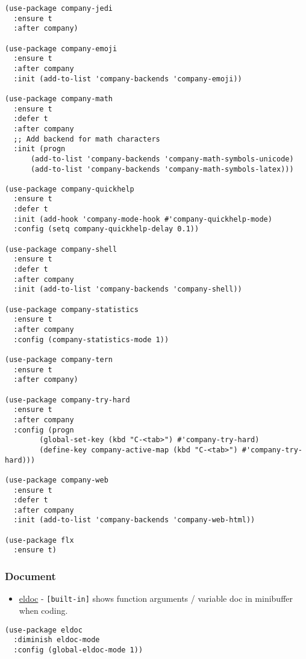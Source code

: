 \documentclass[11pt]{article}
\begin{document}
\begin{verbatim}
(use-package company-jedi
  :ensure t
  :after company)

(use-package company-emoji
  :ensure t
  :after company
  :init (add-to-list 'company-backends 'company-emoji))

(use-package company-math
  :ensure t
  :defer t
  :after company
  ;; Add backend for math characters
  :init (progn
	  (add-to-list 'company-backends 'company-math-symbols-unicode)
	  (add-to-list 'company-backends 'company-math-symbols-latex)))

(use-package company-quickhelp
  :ensure t
  :defer t
  :init (add-hook 'company-mode-hook #'company-quickhelp-mode)
  :config (setq company-quickhelp-delay 0.1))

(use-package company-shell
  :ensure t
  :defer t
  :after company
  :init (add-to-list 'company-backends 'company-shell))

(use-package company-statistics
  :ensure t
  :after company
  :config (company-statistics-mode 1))

(use-package company-tern
  :ensure t
  :after company)

(use-package company-try-hard
  :ensure t
  :after company
  :config (progn
	    (global-set-key (kbd "C-<tab>") #'company-try-hard)
	    (define-key company-active-map (kbd "C-<tab>") #'company-try-hard)))

(use-package company-web
  :ensure t
  :defer t
  :after company
  :init (add-to-list 'company-backends 'company-web-html))

(use-package flx
  :ensure t)
\end{verbatim}

\subsubsection{Document}
\label{sec-1-6-2}
\begin{itemize}
\item \href{https://www.emacswiki.org/emacs/ElDoc}{eldoc} - \texttt{[built-in]} shows function arguments / variable doc in minibuffer when coding.
\end{itemize}

\begin{verbatim}
(use-package eldoc
  :diminish eldoc-mode
  :config (global-eldoc-mode 1))
\end{verbatim}
\end{document}
